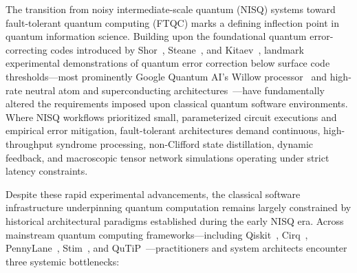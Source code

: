 \documentclass[aps,prx,twocolumn,superscriptaddress,nofootinbib]{revtex4-2}
\begin{document}
The transition from noisy intermediate-scale quantum (NISQ) systems toward fault-tolerant quantum computing (FTQC) marks a defining inflection point in quantum information science. Building upon the foundational quantum error-correcting codes introduced by Shor~\cite{shor1995scheme}, Steane~\cite{steane1996error}, and Kitaev~\cite{kitaev2003fault}, landmark experimental demonstrations of quantum error correction below surface code thresholds---most prominently Google Quantum AI's Willow processor~\cite{google2024willow,google2023suppressing,google2021exponential} and high-rate neutral atom and superconducting architectures~\cite{bravyi2024high}---have fundamentally altered the requirements imposed upon classical quantum software environments. Where NISQ workflows prioritized small, parameterized circuit executions and empirical error mitigation, fault-tolerant architectures demand continuous, high-throughput syndrome processing, non-Clifford state distillation, dynamic feedback, and macroscopic tensor network simulations operating under strict latency constraints.

Despite these rapid experimental advancements, the classical software infrastructure underpinning quantum computation remains largely constrained by historical architectural paradigms established during the early NISQ era. Across mainstream quantum computing frameworks---including Qiskit~\cite{qiskit2019framework}, Cirq~\cite{cirq2020developers}, PennyLane~\cite{pennylane2018bergholm}, Stim~\cite{stim2021gidney}, and QuTiP~\cite{qutip2012johansson}---practitioners and system architects encounter three systemic bottlenecks:
\end{document}
